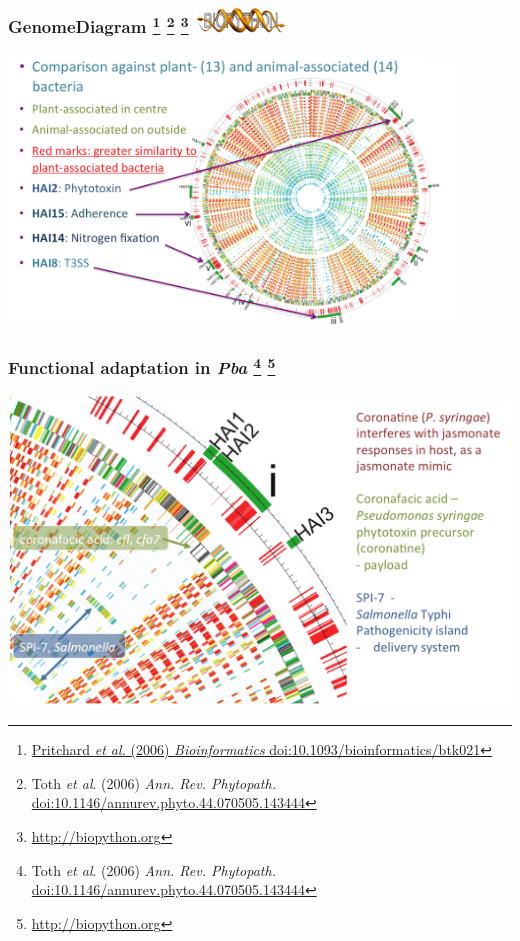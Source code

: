 \begin{frame}
  \frametitle{GenomeDiagram 
    \footnote{\tiny{\href{http://dx.doi.org/10.1093/bioinformatics/btk021}{Pritchard \textit{et al.} (2006) \textit{Bioinformatics} doi:10.1093/bioinformatics/btk021}}}
    \footnote{\tiny{Toth \textit{et al}. (2006) \textit{Ann. Rev. Phytopath.} \href{http://dx.doi.org/10.1146/annurev.phyto.44.070505.143444}{doi:10.1146/annurev.phyto.44.070505.143444}}}
    \footnote{\tiny{\href{http://biopython.org}{http://biopython.org}}}
    \includegraphics[width=0.18\textwidth]{images/biopython}
  }
  \begin{center}
      \includegraphics[width=0.9\textwidth]{images/pba_lgt} 
  \end{center}
\end{frame}

\begin{frame}
  \frametitle{Functional adaptation in \textit{Pba}
    \footnote{\tiny{Toth \textit{et al}. (2006) \textit{Ann. Rev. Phytopath.} \href{http://dx.doi.org/10.1146/annurev.phyto.44.070505.143444}{doi:10.1146/annurev.phyto.44.070505.143444}}}
    \footnote{\tiny{\href{http://biopython.org}{http://biopython.org}}}
  }
  \begin{center}
      \includegraphics[width=1\textwidth]{images/pba_coronatine} 
  \end{center}
\end{frame}

